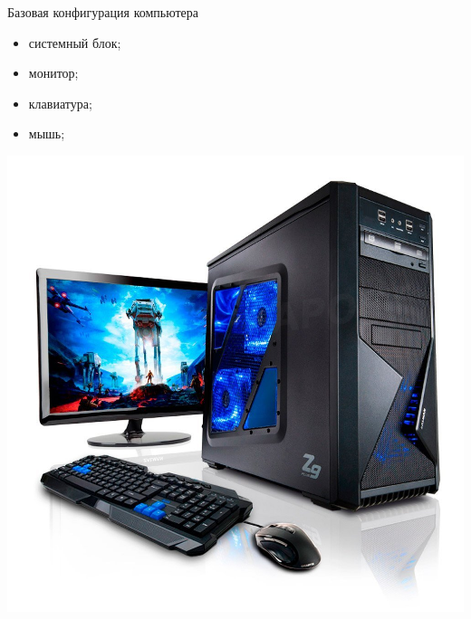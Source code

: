 \documentclass[10pt,pdf,hyperref={unicode}]{beamer}%
\begin{document}
\begin{frame}{Базовая конфигурация компьютера}
  \begin{minipage}{0.4\textwidth}
  \begin{itemize}
    \item системный блок;
    \item монитор;
    \item клавиатура;
    \item мышь;
\end{itemize}
\end{minipage}
\hfill
  \begin{minipage}{0.4\textwidth}
          \includegraphics[width=\textwidth]{p7.png}
  \end{minipage}
\end{frame}
\end{document}
